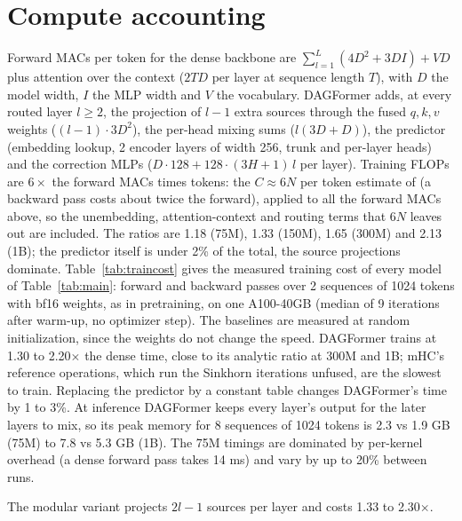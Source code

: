 \documentclass[11pt]{article}
\newcommand{\dagf}{DAGFormer}
\begin{document}
\section{Compute accounting}
\label{app:flops}
Forward MACs per token for the dense backbone are $\sum_{l=1}^{L}(4D^2 + 3DI) + VD$ plus attention over the context ($2TD$ per layer at sequence length $T$), with $D$ the model width, $I$ the MLP width and $V$ the vocabulary. \dagf{} adds, at every routed layer $l\ge2$, the projection of $l{-}1$ extra sources through the fused $q,k,v$ weights ($(l{-}1)\cdot 3D^2$), the per-head mixing sums ($l(3D + D)$), the predictor (embedding lookup, 2 encoder layers of width 256, trunk and per-layer heads) and the correction MLPs ($D\cdot 128 + 128\cdot(3H{+}1)\,l$ per layer). Training FLOPs are $6\times$ the forward MACs times tokens: the $C \approx 6N$ per token estimate of \citet{kaplan2020scaling} (a backward pass costs about twice the forward), applied to all the forward MACs above, so the unembedding, attention-context and routing terms that $6N$ leaves out are included. The ratios are 1.18 (75M), 1.33 (150M), 1.65 (300M) and 2.13 (1B); the predictor itself is under 2\% of the total, the source projections dominate. Table~\ref{tab:traincost} gives the measured training cost of every model of Table~\ref{tab:main}: forward and backward passes over 2 sequences of 1024 tokens with bf16 weights, as in pretraining, on one A100-40GB (median of 9 iterations after warm-up, no optimizer step). The baselines are measured at random initialization, since the weights do not change the speed. \dagf{} trains at 1.30 to 2.20$\times$ the dense time, close to its analytic ratio at 300M and 1B; mHC's reference operations, which run the Sinkhorn iterations unfused, are the slowest to train. Replacing the predictor by a constant table changes \dagf{}'s time by 1 to 3\%. At inference \dagf{} keeps every layer's output for the later layers to mix, so its peak memory for 8 sequences of 1024 tokens is 2.3 vs 1.9 GB (75M) to 7.8 vs 5.3 GB (1B). The 75M timings are dominated by per-kernel overhead (a dense forward pass takes 14 ms) and vary by up to 20\% between runs.

\begin{table}[h]
\centering\footnotesize

\caption{Measured training cost: time per token of a forward and backward pass relative to the dense model of the same size (bf16 weights, 2 sequences of 1024 tokens, one A100-40GB, median of 9 iterations), with dense throughput in tokens per second for training and inference. Inference ratios are in Table~\ref{tab:main}.}
\label{tab:traincost}
\end{table} The modular variant projects $2l{-}1$ sources per layer and costs 1.33 to 2.30$\times$.
\end{document}
